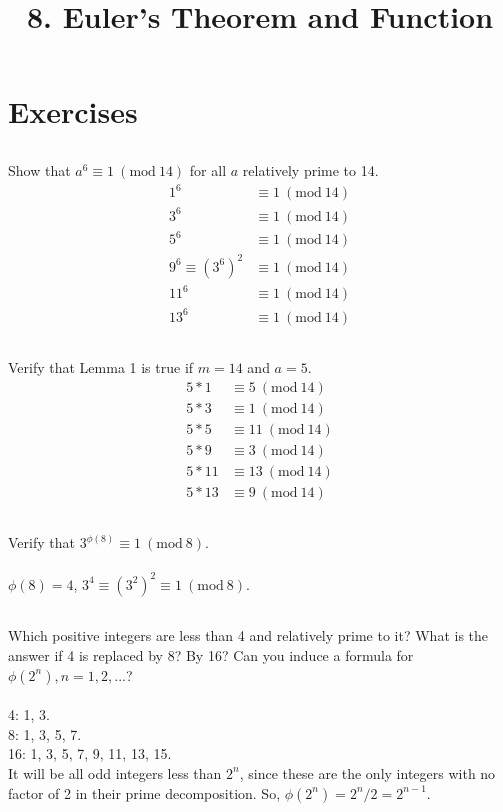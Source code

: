 \documentclass{article}
\begin{document}
\newcommand{\Z}{\mathbb{Z}}
\newcommand{\s}{\sigma}
\newcommand{\p}{\phi}
\newcommand{\Mod}[1]{\ (\mathrm{mod}\ #1)}

\title{8. Euler's Theorem and Function}
\section{Exercises}

\subsection{}
Show that $a^6 \equiv 1 \Mod{14}$ for all $a$ relatively prime to 14.
\begin{align*}
    1^6 &\equiv 1 \Mod{14}\\
    3^6 &\equiv 1 \Mod{14}\\
    5^6 &\equiv 1 \Mod{14}\\
    9^6 \equiv (3^6)^2 &\equiv 1 \Mod{14}\\
    11^6 &\equiv 1 \Mod{14}\\
    13^6 &\equiv 1 \Mod{14}
\end{align*}

\subsection{}
Verify that Lemma 1 is true if $m = 14$ and $a = 5$.
\begin{align*}
    5 * 1 &\equiv 5 \Mod{14}\\
    5 * 3 &\equiv 1 \Mod{14}\\
    5 * 5 &\equiv 11 \Mod{14}\\
    5 * 9 &\equiv 3 \Mod{14}\\
    5 * 11 &\equiv 13 \Mod{14}\\
    5 * 13 &\equiv 9 \Mod{14}
\end{align*}

\subsection{}
Verify that $3^{\p(8)} \equiv 1 \Mod{8}$.\\~\\
$\p(8) = 4$, $3^4 \equiv (3^2)^2 \equiv 1 \Mod{8}$.

\subsection{}
Which positive integers are less than 4 and relatively prime to it?
What is the answer if 4 is replaced by 8? By 16?
Can you induce a formula for $\p(2^n), n = 1, 2, ...$?\\~\\
4: 1, 3.\\
8: 1, 3, 5, 7.\\
16: 1, 3, 5, 7, 9, 11, 13, 15.\\
It will be all odd integers less than $2^n$, since these are the only integers
with no factor of 2 in their prime decomposition.
So, $\p(2^n) = 2^n/2 = 2^{n - 1}$.
\end{document}
